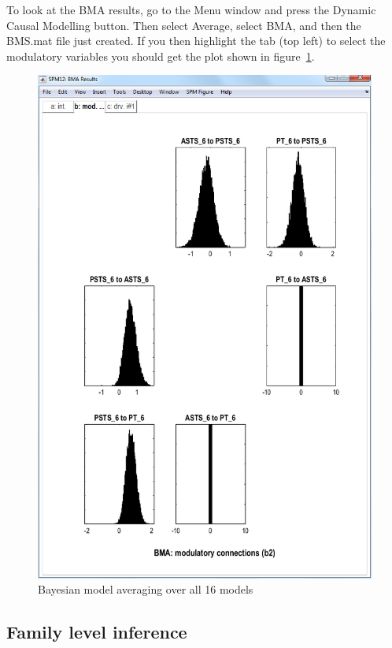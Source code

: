 To look at the BMA results, go to the Menu window and press the Dynamic Causal Modelling button. Then select Average, select BMA, and then the BMS.mat file just created. If you then highlight the tab (top left) to select the modulatory variables you should get the plot shown in figure~\ref{bma}.

\begin{figure}
\begin{center}
\includegraphics[width=150mm]{bms/Slide4.png}
\caption{Bayesian model averaging over all 16 models\label{bma}}
\end{center}
\end{figure}

\subsection{Family level inference}

